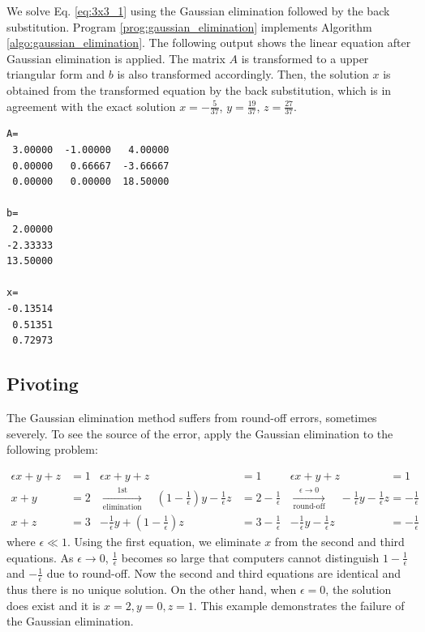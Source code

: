 \bigskip
\begin{example}\label{ex:gaussian_elimination}

We solve Eq. \eqref{eq:3x3_1} using the Gaussian elimination followed by the back substitution.  Program \ref{prog:gaussian_elimination} implements Algorithm \ref{algo:gaussian_elimination}.  The following output shows the linear equation after Gaussian elimination is applied.  The matrix $A$ is transformed to a upper triangular form and $b$ is also transformed accordingly.   Then, the solution $x$ is obtained from the transformed equation by the back substitution, which is in agreement with the exact solution $x=-\displaystyle\frac{5}{37}$, $y=\displaystyle\frac{19}{37}$, $z=\displaystyle\frac{27}{37} $.


\begin{mybox}
\small
\begin{verbatim}
A=
 3.00000  -1.00000   4.00000
 0.00000   0.66667  -3.66667
 0.00000   0.00000  18.50000

b=
 2.00000
-2.33333
13.50000

x=
-0.13514
 0.51351
 0.72973
\end{verbatim}
\normalsize
\end{mybox}
\end{example}

\noindent
\subsection{Pivoting}

The Gaussian elimination method suffers from round-off errors, sometimes severely. To see the source of the error, apply the Gaussian elimination to the following problem:

\small
\begin{subequations}
\begin{align*}
\epsilon x + y + z &= 1 &  \epsilon x + y + z &= 1 & \epsilon x + y + z &= 1 \\
x + y &= 2 & \xrightarrow[\text{elimination}]{\text{1st}} \quad \left (1-\frac{1}{\epsilon}\right )y - \frac{1}{\epsilon} z &= 2 - \frac{1}{\epsilon}
&  \xrightarrow[\text{round-off}]{\epsilon \rightarrow 0} \quad -\frac{1}{\epsilon}y - \frac{1}{\epsilon} z &= - \frac{1}{\epsilon}\\
x + z &= 3 & -\frac{1}{\epsilon} y + \left ( 1-\frac{1}{\epsilon} \right ) z &= 3 - \frac{1}{\epsilon}  &
-\frac{1}{\epsilon} y - \frac{1}{\epsilon} z &=  - \frac{1}{\epsilon}
\end{align*}
\end{subequations}
\normalsize
where $\epsilon \ll 1$.  Using the first equation, we eliminate $x$ from the second and third equations. As $\epsilon \rightarrow 0$, $\displaystyle\frac{1}{\epsilon}$ becomes so large that computers cannot distinguish $1 - \displaystyle\frac{1}{\epsilon}$ and $- \displaystyle\frac{1}{\epsilon}$ due to round-off. Now the second and third equations are identical and thus there is no unique solution.  On the other hand, when $\epsilon=0$, the solution does exist and it is $x=2, y=0, z=1$.  This example demonstrates the failure of the Gaussian elimination.  

